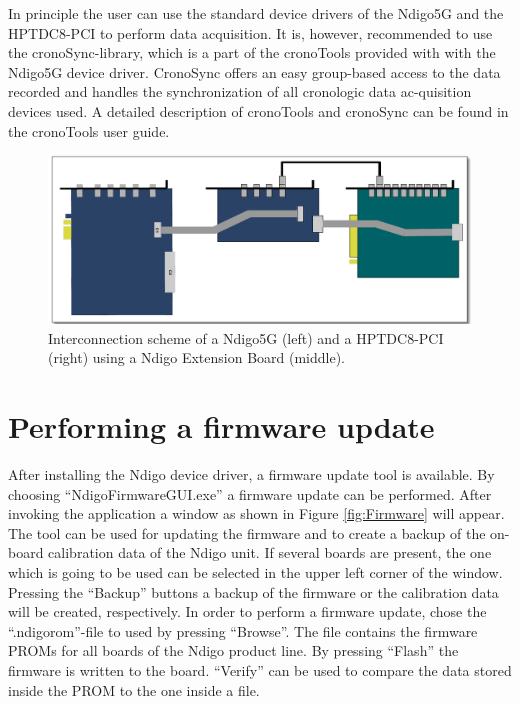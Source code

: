 		In principle the user can use the standard device drivers of the Ndigo5G and the HPTDC8-PCI to perform data acquisition. It is, however, recommended to use the cronoSync-library, which is a part of the cronoTools provided with with the Ndigo5G device driver. CronoSync offers an easy 
group-based access to the data recorded and handles the synchronization of all cronologic data ac-quisition devices used. A detailed description of cronoTools and cronoSync can be found in the cronoTools user guide.

		\begin{figure}[hb]
			\begin{center}
				\includegraphics[width=\textwidth]{figures/InterconNdigo.pdf}
				\caption{\label{fig:InterconNdigo} Interconnection scheme of a Ndigo5G (left) and a HPTDC8-PCI (right) using a Ndigo Extension Board (middle).}
			\end{center}
		\end{figure}
	
	\section{Performing a firmware update}
	
		After installing the Ndigo device driver, a firmware update tool is available. By choosing ``NdigoFirmwareGUI.exe'' a firmware update can be performed. After invoking the application a window as shown in Figure \ref{fig:Firmware} will appear. The tool can be used for updating the firmware and to create a backup of the on-board calibration data of the Ndigo unit. If several boards are present, the one which is going to be used can be selected in the upper left corner of the window. Pressing the ``Backup'' buttons a backup of the firmware or the calibration data will be created, respectively. In order to perform a firmware update, chose the ``.ndigorom''-file to used by pressing ``Browse''. The file contains the firmware PROMs for all boards of the Ndigo product line. By pressing ``Flash'' the firmware is written to the board. ``Verify'' can be used to compare the data stored inside the PROM to the one inside a file.\par
		
